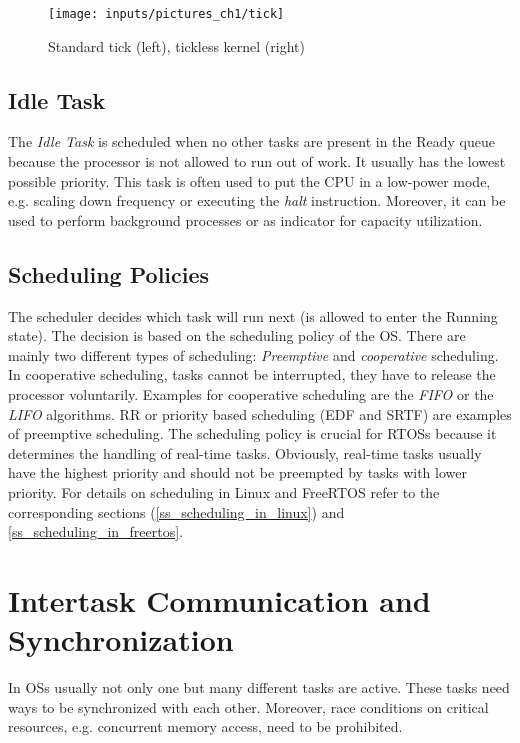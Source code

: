 \begin{figure}[htb]
	\begin{center}
		\texttt{[image: inputs/pictures\_ch1/tick]}
		\caption[Standard and tickless kernel]{Standard tick (left), tickless kernel (right) \cite{barry:ftssp}} \label{fig_tick}
	\end{center}
\end{figure}

\subsection{Idle Task}
The \textit{Idle Task} is scheduled when no other tasks are present in the Ready queue because the processor is not allowed to run out of work.
It usually has the lowest possible priority.
This task is often used to put the \ac{CPU} in a low-power mode, e.g. scaling down frequency or executing the \textit{halt} instruction. 
Moreover, it can be used to perform background processes or as indicator for capacity utilization.  
  
\subsection{Scheduling Policies}\label{ss_scheduling_policy} 
The scheduler decides which task will run next (is allowed to enter the Running state). 
The decision is based on the scheduling policy of the \ac{OS}.
There are mainly two different types of scheduling: \textit{Preemptive} and \textit{cooperative} scheduling.
In cooperative scheduling, tasks cannot be interrupted, they have to release the processor voluntarily. 
Examples for cooperative scheduling are the \textit{\ac{FIFO}} or the \textit{\ac{LIFO}} algorithms.
\ac{RR} or priority based scheduling (\ac{EDF} and \ac{SRTF}) are examples of preemptive scheduling.
The scheduling policy is crucial for \acp{RTOS} because it determines the handling of real-time tasks.
Obviously, real-time tasks usually have the highest priority and should not be preempted by tasks with lower priority.
For details on scheduling in Linux and FreeRTOS refer to the corresponding sections (\ref{ss_scheduling_in_linux}) and \ref{ss_scheduling_in_freertos}.

\section{Intertask Communication and Synchronization}\label{s_intertask_communication}
In \acp{OS} usually not only one but many different tasks are active.
These tasks need ways to be synchronized with each other.
Moreover, race conditions on critical resources, e.g. concurrent memory access, need to be prohibited.

